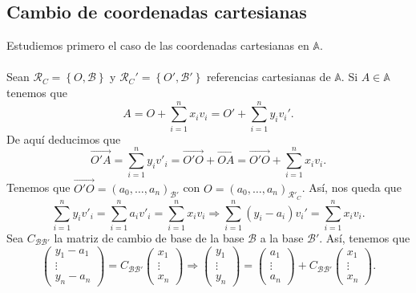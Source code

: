 \subsection{Cambio de coordenadas cartesianas}
Estudiemos primero el caso de las coordenadas cartesianas en $\displaystyle \mathbb{A} $. \\ \\
Sean $\displaystyle \mathcal{R}_{C} = \left\{ O, \mathcal{B}\right\} $ y $\displaystyle \mathcal{R}_{C}' = \left\{ O', \mathcal{B}'\right\}  $ referencias cartesianas de $\displaystyle \mathbb{A} $. Si $\displaystyle A \in \mathbb{A} $ tenemos que 
\[A = O + \sum^{n}_{i = 1}x_{i}v_{i} = O'+\sum^{n}_{i = 1}y_{i}v_{i}' .\]
De aquí deducimos que 
\[\overrightarrow{O'A} = \sum^{n}_{i = 1}y_{i}v'_{i} = \overrightarrow{O'O} + \overrightarrow{OA} = \overrightarrow{O'O} + \sum^{n}_{ i = 1}x_{i}v_{i}  .\]
Tenemos que $\displaystyle \overrightarrow{O'O} = \left(a_{0}, \ldots, a_{n}\right)_{\mathcal{B}'} $ con $\displaystyle O = \left(a_{0}, \ldots, a_{n}\right)_{\mathcal{R}'_{C}} $. Así, nos queda que 
\[\sum^{n}_{i = 1}y_{i}v'_{i}= \sum^{n}_{i = 1}a_{i}v'_{i} = \sum^{n}_{i = 1}x_{i}v_{i} \Rightarrow \sum^{n}_{i = 1}\left(y_{i}-a_{i}\right)v_{i}' = \sum^{n}_{i = 1}x_{i}v_{i} .\]
Sea $\displaystyle C_{\mathcal{B}\mathcal{B}'} $ la matriz de cambio de base de la base $\displaystyle \mathcal{B} $ a la base $\displaystyle \mathcal{B}' $. 
Así, tenemos que
\[\begin{pmatrix} y_{1}-a_{1} \\ \vdots \\ y_{n}-a_{n} \end{pmatrix}= C_{\mathcal{B}\mathcal{B}'}\begin{pmatrix} x_{1} \\ \vdots \\ x_{n} \end{pmatrix} \Rightarrow \begin{pmatrix} y_{1} \\ \vdots \\ y_{n} \end{pmatrix} = \begin{pmatrix} a_{1} \\ \vdots \\ a_{n} \end{pmatrix} + C_{\mathcal{B}\mathcal{B}'}\begin{pmatrix} x_{1} \\ \vdots \\ x_{n} \end{pmatrix}.\]
